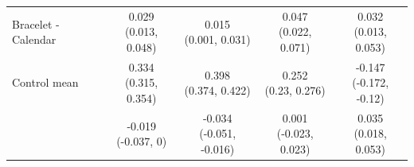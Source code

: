 \documentclass[
]{article}
\begin{document}
\begin{table}
{\begin{tabular}[t]{lcccc}
\midrule
\addlinespace \addlinespace \addlinespace
Bracelet - Calendar & \makecell[c]{0.029\\(0.013, 0.048)} & \makecell[c]{0.015\\(0.001, 0.031)} & \makecell[c]{0.047\\(0.022, 0.071)} & \makecell[c]{0.032\\(0.013, 0.053)}\\
\addlinespace \addlinespace \addlinespace
Control mean & \makecell[c]{0.334\\(0.315, 0.354)} & \makecell[c]{0.398\\(0.374, 0.422)} & \makecell[c]{0.252\\(0.23, 0.276)} & \makecell[c]{-0.147\\(-0.172, -0.12)}\\
\addlinespace \addlinespace \addlinespace
 & \makecell[c]{-0.019\\(-0.037, 0)} & \makecell[c]{-0.034\\(-0.051, -0.016)} & \makecell[c]{0.001\\(-0.023, 0.023)} & \makecell[c]{0.035\\(0.018, 0.053)}\\
\bottomrule
\end{tabular}}
\end{table}
\end{document}
